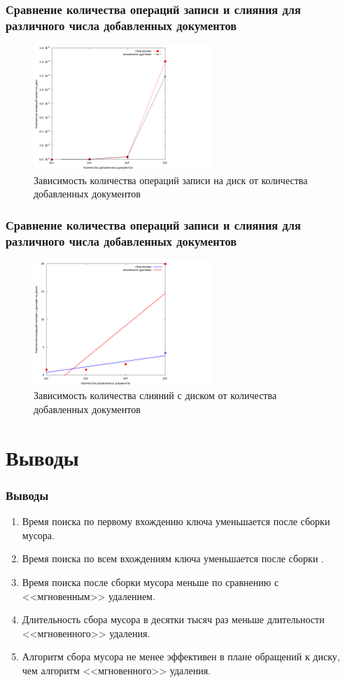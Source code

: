 \documentclass[aspectratio=169, pdf, 8pt, unicode]{beamer}
\begin{document}
\begin{frame}[fragile]
\frametitle{Сравнение количества операций записи и слияния для различного числа
добавленных документов}
\begin{figure}[H]
\centering
\hfil
\includegraphics[width=0.6\textwidth]{fig/writecalls.png}
\caption{Зависимость количества операций записи на диск от количества добавленных документов}
\end{figure}
\end{frame}

\begin{frame}[fragile]
\frametitle{Сравнение количества операций записи и слияния для различного числа
добавленных документов}
\begin{figure}[H]
\centering
\hfil
\includegraphics[width=0.6\textwidth]{fig/merges.png}
\caption{Зависимость количества слияний с диском от количества добавленных документов}
\end{figure}
\end{frame}

\section{Выводы}

\begin{frame}[fragile]
\frametitle{Выводы}
\begin{enumerate}
\item Время поиска по первому вхождению ключа уменьшается после сборки мусора.
\item Время поиска по всем вхождениям ключа уменьшается после сборки .
\item Время поиска после сборки мусора меньше по сравнению с <<мгновенным>>
удалением.
\item Длительность сбора мусора в десятки тысяч раз меньше длительности
<<мгновенного>> удаления.
\item Алгоритм сбора мусора не менее эффективен в плане обращений к диску, чем
алгоритм <<мгновенного>> удаления.
\end{enumerate}
\end{frame}
\end{document}
